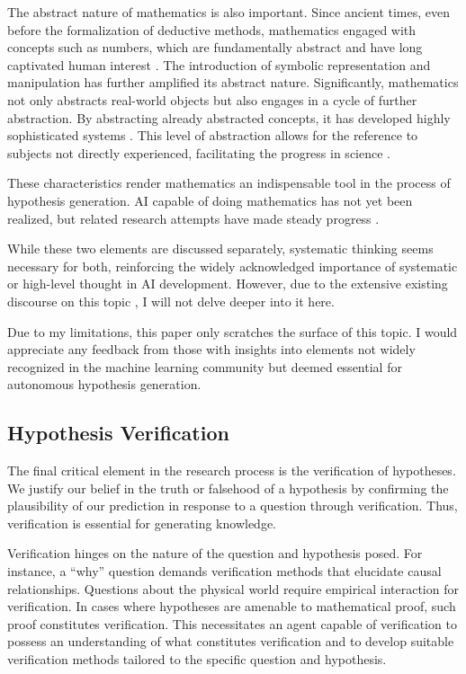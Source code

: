 The abstract nature of mathematics is also important. Since ancient times, even before the formalization of deductive methods, mathematics engaged with concepts such as numbers, which are fundamentally abstract and have long captivated human interest \cite{david2010history}. The introduction of symbolic representation and manipulation has further amplified its abstract nature. Significantly, mathematics not only abstracts real-world objects but also engages in a cycle of further abstraction. By abstracting already abstracted concepts, it has developed highly sophisticated systems \cite{bochner1968role}. This level of abstraction allows for the reference to subjects not directly experienced, facilitating the progress in science \cite{heisenberg2008abstraction}. 

These characteristics render mathematics an indispensable tool in the process of hypothesis generation. AI capable of doing mathematics has not yet been realized, but related research attempts have made steady progress \cite{rabe2021towards,imani2023mathprompter}.

While these two elements are discussed separately, systematic thinking seems necessary for both, reinforcing the widely acknowledged importance of systematic or high-level thought in AI development. However, due to the extensive existing discourse on this topic \cite{goyal2022inductive}, I will not delve deeper into it here.

Due to my limitations, this paper only scratches the surface of this topic. I would appreciate any feedback from those with insights into elements not widely recognized in the machine learning community but deemed essential for autonomous hypothesis generation.

\subsection{Hypothesis Verification}
The final critical element in the research process is the verification of hypotheses. We justify our belief in the truth or falsehood of a hypothesis by confirming the plausibility of our prediction in response to a question through verification. Thus, verification is essential for generating knowledge.

Verification hinges on the nature of the question and hypothesis posed. For instance, a ``why'' question demands verification methods that elucidate causal relationships. Questions about the physical world require empirical interaction for verification. In cases where hypotheses are amenable to mathematical proof, such proof constitutes verification. This necessitates an agent capable of verification to possess an understanding of what constitutes verification and to develop suitable verification methods tailored to the specific question and hypothesis.

